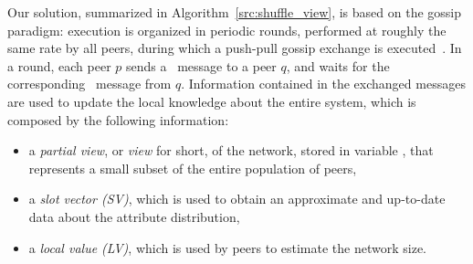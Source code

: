 Our solution, summarized in Algorithm~\ref{src:shuffle_view}, is based on the
gossip paradigm: execution is organized in periodic rounds, performed at
roughly the same rate by all peers, during which a push-pull gossip exchange
is executed~\cite{peersampling}. In a round, each peer $p$ sends a \request\ message to a peer $q$, and waits for the corresponding \reply\ message from $q$. Information contained in the exchanged messages are used to update the local knowledge about the entire system, which is composed by the following information:
\begin{itemize}
\item a {\em partial view}, or {\em view} for short, of the network, stored in
variable \subview, that represents a small subset of the entire population of
peers,
\item a {\em slot vector (SV)}, which is used to obtain an approximate and
up-to-date data about the attribute distribution,
\item a {\em local value (LV)}, which is used by peers to estimate the network
size.
\end{itemize}
